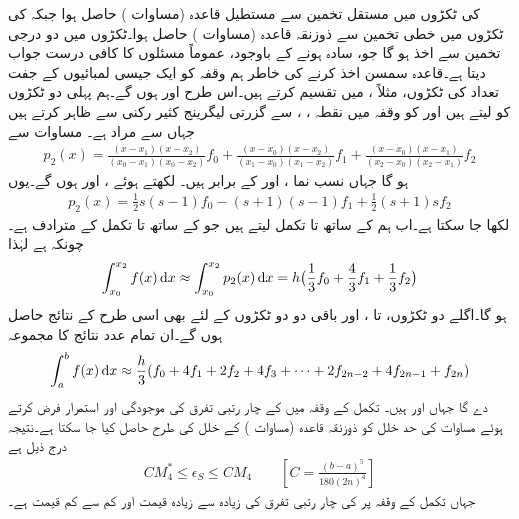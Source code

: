  کی ٹکڑوں میں مستقل تخمین سے مستطیل قاعدہ (مساوات ) حاصل ہوا جبکہ  کی ٹکڑوں میں خطی تخمین سے ذوزنقہ قاعدہ (مساوات ) حاصل ہوا۔ٹکڑوں میں دو درجی تخمین سے  اخذ ہو گا جو، سادہ ہونے کے باوجود،  عموماً مسئلوں کا کافی درست جواب دیتا ہے۔قاعدہ سمسن  اخذ کرنے کی خاطر ہم وقفہ  کو ایک جیسی لمبائیوں کے  جفت تعداد کی  ٹکڑوں، مثلاً ، میں تقسیم کرتے ہیں۔اس طرح  اور   ہوں گے۔ہم پہلی دو ٹکڑوں  کو لیتے ہیں اور   کو وقفہ  میں نقطہ ، ،  سے گزرتی  لیگرینج کثیر رکنی  سے ظاہر کرتے ہیں جہاں  سے مراد  ہے۔ مساوات  سے
\begin{multline}\label{مساوات_اعدادی_لیگرینج_کثیر_رکنی_الف}
p_2(x)=\frac{(x-x_1)(x-x_2)}{(x_0-x_1)(x_0-x_2)}f_0+\frac{(x-x_0)(x-x_2)}{(x_1-x_0)(x_1-x_2)}f_1+\frac{(x-x_0)(x-x_1)}{(x_2-x_0)(x_2-x_1)}f_2
\end{multline}
ہو گا جہاں نسب نما ،  اور  کے برابر ہیں۔  لکھتے ہوئے  ،  اور  ہوں گے۔یوں 
\begin{align}
p_2(x)=\frac{1}{2}s(s-1)f_0-(s+1)(s-1)f_1+\frac{1}{2}(s+1)sf_2
\end{align}
لکھا جا سکتا ہے۔اب ہم  کے ساتھ  تا  تکمل لیتے ہیں جو  کے ساتھ  تا  تکمل کے مترادف ہے۔چونکہ  ہے لہٰذا
\begin{align*}
\int_{x_0}^{x_2}f(x)\dif x\approx \int_{x_0}^{x_2}p_2(x)\dif x=h\big(\frac{1}{3}f_0+\frac{4}{3}f_1+\frac{1}{3}f_2\big)
\end{align*}
ہو گا۔اگلے دو ٹکڑوں،  تا ، اور باقی دو دو ٹکڑوں  کے لئے بھی  اسی طرح کے نتائج حاصل ہوں گے۔ان تمام  عدد نتائج کا مجموعہ 
\begin{align}\label{مساوات_اعدادی_تکمل_سمسن_قاعدہ}
\int_a^b f(x)\dif x\approx \frac{h}{3}(f_0+4f_1+2f_2+4f_3+\cdots+2f_{2n-2}+4f_{2n-1}+f_{2n})
\end{align}
دے گا جہاں  اور  ہیں۔ تکمل کے وقفہ میں  کے چار رتبی تفرق کی موجودگی اور استمرار فرض کرتے ہوئے مساوات  کی حد خلل  کو ذوزنقہ قاعدہ (مساوات ) کے خلل کی طرح حاصل کیا جا سکتا ہے۔نتیجہ درج ذیل ہے
\begin{align}\label{مساوات_اعدادی_سمسن_حد_خلل}
CM_4^*\le \epsilon_S\le CM_4\quad \quad [C=\tfrac{(b-a)^5}{180(2n)^4}]
\end{align}
جہاں تکمل کے وقفہ پر  کی چار رتبی تفرق کی زیادہ سے زیادہ قیمت  اور کم سے کم قیمت  ہے۔

